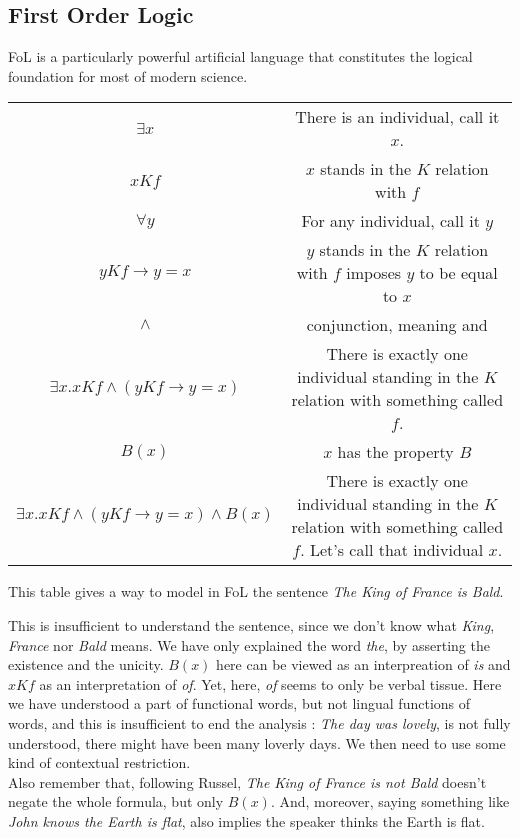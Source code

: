 \documentclass{cours}
\begin{document}
\subsection{First Order Logic}
FoL is a particularly powerful artificial language that constitutes the logical foundation for most of modern science. 
\begin{tabular}{cc}
    $\exists x$ & There is an individual, call it $x$.\\
    $xKf$ & $x$ stands in the $K$ relation with $f$\\
    $\forall y$ & For any individual, call it $y$\\
    $yKf \rightarrow y = x$ & $y$ stands in the $K$ relation with $f$ imposes $y$ to be equal to $x$\\
    $\wedge$ & conjunction, meaning and\\
    $\exists x.xKf\wedge \left(yKf \rightarrow y = x\right)$ & There is exactly one individual standing in the $K$ relation with something called $f$.\\
    $B(x)$ & $x$ has the property $B$\\
    $\exists x.xKf\wedge \left(yKf \rightarrow y = x\right) \wedge B(x)$ & There is exactly one individual standing in the $K$ relation with something called $f$. Let's call that individual $x$.
\end{tabular}
This table gives a way to model in FoL the sentence \textsl{The King of France is Bald}.

This is insufficient to understand the sentence, since we don't know what \textsl{King}, \textsl{France} nor \textsl{Bald} means. We have only explained the word \textsl{the}, by asserting the existence and the unicity. $B(x)$ here can be viewed as an interpreation of \textsl{is} and $xKf$ as an interpretation of \textsl{of}. Yet, here, \textsl{of} seems to only be verbal tissue. Here we have understood a part of functional words, but not lingual functions of words, and this is insufficient to end the analysis : \textsl{The day was lovely}, is not fully understood, there might have been many loverly days. We then need to use some kind of contextual restriction. \\
Also remember that, following Russel, \textsl{The King of France is not Bald} doesn't negate the whole formula, but only $B(x)$. And, moreover, saying something like \textsl{John knows the Earth is flat}, also implies the speaker thinks the Earth is flat. \\
\end{document}
